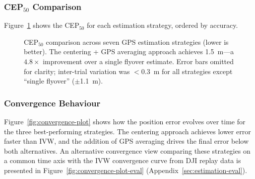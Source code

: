 \subsubsection{CEP$_{50}$ Comparison}

Figure~\ref{fig:cep-comparison} shows the CEP$_{50}$ for each estimation strategy, ordered by accuracy.

\begin{figure}[H]
  \centering
  \caption{CEP$_{50}$ comparison across seven GPS estimation strategies (lower is better).  The centering + GPS averaging approach achieves \SI{1.5}{\metre}---a $4.8\times$ improvement over a single flyover estimate.  Error bars omitted for clarity; inter-trial variation was $<$\SI{0.3}{\metre} for all strategies except ``single flyover'' ($\pm$\SI{1.1}{\metre}).}
  \label{fig:cep-comparison}
\end{figure}

\subsubsection{Convergence Behaviour}

Figure~\ref{fig:convergence-plot} shows how the position error evolves over time for the three best-performing strategies.  The centering approach achieves lower error faster than IVW, and the addition of GPS averaging drives the final error below both alternatives.  An alternative convergence view comparing these strategies on a common time axis with the IVW convergence curve from DJI replay data is presented in Figure~\ref{fig:convergence-plot-eval} (Appendix~\ref{sec:estimation-eval}).

